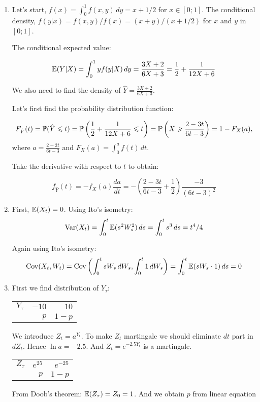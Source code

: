 \documentclass[12pt, a4paper]{article}
\begin{document}
\begin{enumerate}
\item Let's start, $f(x)=\int_0^1 f(x,y) \, dy= x+1/2$ for $x\in [0;1]$. The conditional density, $f(y|x)=f(x,y)/f(x)=(x+y)/(x+1/2)$ for $x$ and $y$ in $[0;1]$.

The conditional expected value:

\[
\E(Y|X)=\int_0^1 y f(y|X) \, dy = \frac{3X+2}{6X+3}=\frac{1}{2}+\frac{1}{12X+6}
\]

We also need to find the density of $\hat{Y}=\frac{3X+2}{6X+3}$.

Let's first find the probability distribution function:

\[
F_{\hat{Y}}(t)=\P(\hat{Y} \leq t) = \P\left( \frac{1}{2}+\frac{1}{12X+6} \leq t \right) = \P\left( X \geq \frac{2-3t}{6t-3} \right)= 1 - F_X(a),
\]
where $a=\frac{2-3t}{6t-3}$ and $F_X(a) = \int_0^a f(t) \, dt$.

Take the derivative with respect to $t$ to obtain:

\[
f_{\hat{Y}}(t)=-f_X(a)\frac{da}{dt}=-\left( \frac{2-3t}{6t-3} + \frac{1}{2}  \right) \frac{-3}{(6t-3)^2}
\]

\item First, $\E(X_t)=0$. Using Ito's isometry:
\[
\Var(X_t)=\int_0^t  \E(s^2 W_s^2)  \, ds = \int_0^t  s^3  \, ds = t^4/4
\]

Again using Ito's isometry:
\[
\Cov( X_t, W_t) = \Cov \left( \int_0^t sW_s \, dW_s , \int_0^t 1 \, dW_s \right) = \int_0^t \E(sW_s\cdot 1) \, ds = 0
\]

\item First we find distribution of $Y_{\tau}$:

\begin{tabular}{rrr}
\toprule
$Y_{\tau}$ & $-10$ & $10$ \\
          & $p$   & $1-p$ \\
\bottomrule
\end{tabular}

We introduce $Z_t = a^{Y_t}$. To make $Z_t$ martingale we should eliminate $dt$ part in $dZ_t$. Hence $\ln a = -2.5$.  And $Z_t = e^{-2.5 Y_t}$ is a martingale.

\begin{tabular}{rrr}
\toprule
$Z_{\tau}$ & $e^{25}$ & $e^{-25}$ \\
          & $p$   & $1-p$ \\
\bottomrule
\end{tabular}

From Doob's theorem: $\E(Z_{\tau}) = Z_0 = 1$. And we obtain $p$ from linear equation


\end{enumerate}
\end{document}
